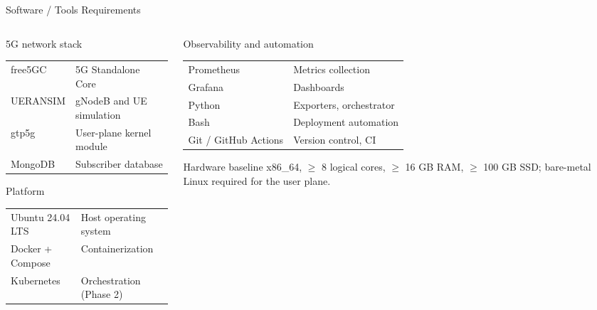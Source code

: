 \documentclass[aspectratio=169,11pt]{beamer}
\begin{document}
\begin{frame}{Software / Tools Requirements}
  \small
  \begin{columns}[T,onlytextwidth]
    \begin{column}{0.49\textwidth}
      \begin{block}{5G network stack}
        \renewcommand{\arraystretch}{1.15}
        \begin{tabular}{@{}ll@{}}
          free5GC & 5G Standalone Core\\
          UERANSIM & gNodeB and UE simulation\\
          gtp5g & User-plane kernel module\\
          MongoDB & Subscriber database\\
        \end{tabular}
      \end{block}
      \begin{block}{Platform}
        \renewcommand{\arraystretch}{1.15}
        \begin{tabular}{@{}ll@{}}
          Ubuntu 24.04 LTS & Host operating system\\
          Docker + Compose & Containerization\\
          Kubernetes & Orchestration (Phase 2)\\
        \end{tabular}
      \end{block}
    \end{column}
    \begin{column}{0.49\textwidth}
      \begin{block}{Observability and automation}
        \renewcommand{\arraystretch}{1.15}
        \setlength{\tabcolsep}{3pt}
        \begin{tabular}{@{}ll@{}}
          Prometheus & Metrics collection\\
          Grafana & Dashboards\\
          Python & Exporters, orchestrator\\
          Bash & Deployment automation\\
          Git / GitHub Actions & Version control, CI\\
        \end{tabular}
      \end{block}
      \begin{block}{Hardware baseline}
        \small
        x86\_64, $\geq$ 8 logical cores, $\geq$ 16 GB RAM,
        $\geq$ 100 GB SSD; bare-metal Linux required for the user plane.
      \end{block}
    \end{column}
  \end{columns}
\end{frame}
\end{document}
